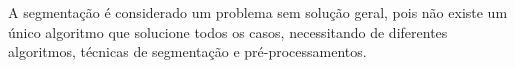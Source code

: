 \begin{question}

    A segmentação é considerado um problema sem solução geral, pois não existe 
    um único algoritmo que solucione todos os casos, necessitando de diferentes 
    algoritmos, técnicas de segmentação e pré-processamentos.
  
\end{question}
  